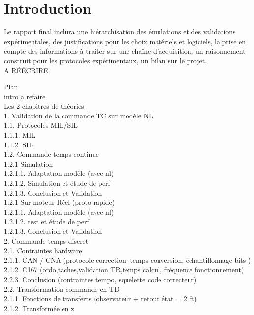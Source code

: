 \chapter*{Introduction}
\label{chap:Intro}
\begin{LARGE}
Le rapport final inclura une hiérarchisation des émulations et des validations expérimentales, des justifications pour les choix matériels et logiciels, la prise en compte des informations à traiter sur une chaîne d'acquisition, un raisonnement construit pour les protocoles expérimentaux, un bilan sur le projet.\\
A RÉÉCRIRE.
\end{LARGE}
Plan \\
intro a refaire\\
Les 2 chapitres de théories\\
1. Validation de la commande TC sur modèle NL \\
	1.1. Protocoles MIL/SIL\\
		1.1.1. MIL\\
		1.1.2. SIL\\	
	1.2. Commande temps continue\\
		1.2.1 Simulation \\
			1.2.1.1. Adaptation modèle (avec nl)\\
			1.2.1.2. Simulation et étude de perf\\
			1.2.1.3. Conclusion et Validation\\
		1.2.1 Sur moteur Réel (proto rapide)\\
			1.2.1.1. Adaptation modèle (avec nl)\\
			1.2.1.2. test et étude de perf\\
			1.2.1.3. Conclusion et Validation\\
2. Commande temps discret \\
	2.1. Contraintes hardware \\
		2.1.1. CAN / CNA (protocole correction, temps conversion, échantillonnage bits )\\
		2.1.2. C167 (ordo,taches,validation TR,temps calcul, fréquence fonctionnement)\\
		2.2.3. Conclusion  (contraintes tempo, squelette code correcteur)\\
	2.2. Transformation commande en TD\\
		2.1.1. Fonctions de transferts (observateur + retour état = 2 ft)\\
		2.1.2. Transformée en z\\		
